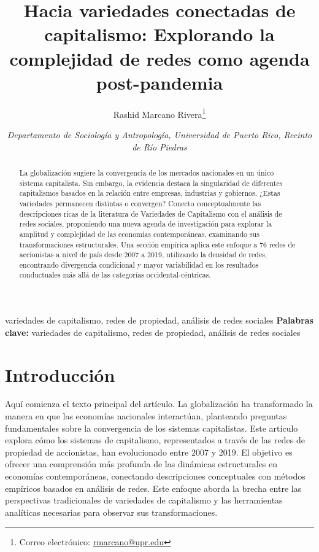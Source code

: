 \documentclass[12pt]{article}
\newcommand{\keywords}[1]{%
  \ifx#1\empty\else
    \vspace{0.5em}
    \noindent\textbf{Palabras clave:} #1
    \par
  \fi
}
\newcommand{\customtitle}[1]{\title{\textsf{\textbf{#1}}}}
\newcommand{\customauthor}[3]{\author{#1\thanks{#3}} \date{\textit{#2}}}
\begin{document}

\renewcommand{\rmdefault}{ptm}
\fontsize{12}{15}\selectfont

\let\oldfootnote\footnote
\renewcommand{\footnote}[1]{%
  {\footnotesize\oldfootnote{#1}}
}
\singlespacing
\customtitle{Hacia variedades conectadas de capitalismo: Explorando la complejidad de redes como agenda post-pandemia}
\customauthor
    {Rashid Marcano Rivera} %
    {Departamento de Sociología y Antropología, Universidad de Puerto Rico, Recinto de Río Piedras} %
    {Correo electrónico: \href{mailto:rmarcano@upr.edu}{rmarcano@upr.edu}} %

\maketitle

\begin{abstractbox}
\begin{abstract}
\small
La globalización sugiere la convergencia de los mercados nacionales en un único sistema capitalista. Sin embargo, la evidencia destaca la singularidad de diferentes capitalismos basados en la relación entre empresas, industrias y gobiernos. ¿Estas variedades permanecen distintas o convergen? Conecto conceptualmente las descripciones ricas de la literatura de Variedades de Capitalismo con el análisis de redes sociales, proponiendo una nueva agenda de investigación para explorar la amplitud y complejidad de las economías contemporáneas, examinando sus transformaciones estructurales. Una sección empírica aplica este enfoque a 76 redes de accionistas a nivel de país desde 2007 a 2019, utilizando la densidad de redes, encontrando divergencia condicional y mayor variabilidad en los resultados conductuales más allá de las categorías occidental-céntricas.
\end{abstract}\end{abstractbox}

\keywords{variedades de capitalismo, redes de propiedad, análisis de redes sociales}
\medskip
\onehalfspacing
\section{Introducción}
Aquí comienza el texto principal del artículo.  La globalización ha transformado la manera en que las economías nacionales interactúan, planteando preguntas fundamentales sobre la convergencia de los sistemas capitalistas. Este artículo explora cómo los sistemas de capitalismo, representados a través de las redes de propiedad de accionistas, han evolucionado entre 2007 y 2019. El objetivo es ofrecer una comprensión más profunda de las dinámicas estructurales en economías contemporáneas, conectando descripciones conceptuales con métodos empíricos basados en análisis de redes. Este enfoque aborda la brecha entre las perspectivas tradicionales de variedades de capitalismo y las herramientas analíticas necesarias para observar sus transformaciones.
\end{document}
